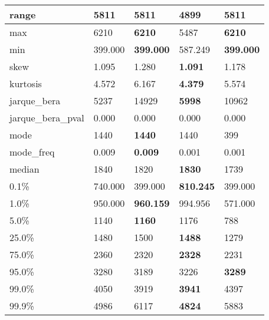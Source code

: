 \begin{table}[H]
\begin{tabular}{|l|m{10em}|m{10em}|m{10em}|m{10em}|}
\hline range & 5811 & \bfseries 5811 & \cellcolor[rgb]{0.9, 0.54, 0.52} 4899 & \bfseries 5811 \\
\hline max & 6210 & \bfseries 6210 & \cellcolor[rgb]{0.9, 0.54, 0.52} 5487 & \bfseries 6210 \\
\hline min & 399.000 & \bfseries 399.000 & \cellcolor[rgb]{0.9, 0.54, 0.52} 587.249 & \bfseries 399.000 \\
\hline skew & 1.095 & \cellcolor[rgb]{0.9, 0.54, 0.52} 1.280 & \bfseries 1.091 & 1.178 \\
\hline kurtosis & 4.572 & \cellcolor[rgb]{0.9, 0.54, 0.52} 6.167 & \bfseries 4.379 & 5.574 \\
\hline jarque\_bera & 5237 & \cellcolor[rgb]{0.9, 0.54, 0.52} 14929 & \bfseries 5998 & 10962 \\
\hline jarque\_bera\_pval & 0.000 & 0.000 & 0.000 & 0.000 \\
\hline mode & 1440 & \bfseries 1440 & 1440 & \cellcolor[rgb]{0.9, 0.54, 0.52} 399 \\
\hline mode\_freq & 0.009 & \bfseries 0.009 & \cellcolor[rgb]{0.9, 0.54, 0.52} 0.001 & 0.001 \\
\hline median & 1840 & 1820 & \bfseries 1830 & \cellcolor[rgb]{0.9, 0.54, 0.52} 1739 \\
\hline 0.1\% & 740.000 & \cellcolor[rgb]{0.9, 0.54, 0.52} 399.000 & \bfseries 810.245 & \cellcolor[rgb]{0.9, 0.54, 0.52} 399.000 \\
\hline 1.0\% & 950.000 & \bfseries 960.159 & 994.956 & \cellcolor[rgb]{0.9, 0.54, 0.52} 571.000 \\
\hline 5.0\% & 1140 & \bfseries 1160 & 1176 & \cellcolor[rgb]{0.9, 0.54, 0.52} 788 \\
\hline 25.0\% & 1480 & 1500 & \bfseries 1488 & \cellcolor[rgb]{0.9, 0.54, 0.52} 1279 \\
\hline 75.0\% & 2360 & 2320 & \bfseries 2328 & \cellcolor[rgb]{0.9, 0.54, 0.52} 2231 \\
\hline 95.0\% & 3280 & \cellcolor[rgb]{0.9, 0.54, 0.52} 3189 & 3226 & \bfseries 3289 \\
\hline 99.0\% & 4050 & 3919 & \bfseries 3941 & \cellcolor[rgb]{0.9, 0.54, 0.52} 4397 \\
\hline 99.9\% & 4986 & \cellcolor[rgb]{0.9, 0.54, 0.52} 6117 & \bfseries 4824 & 5883 \\
\hline
\end{tabular}
\end{table}
